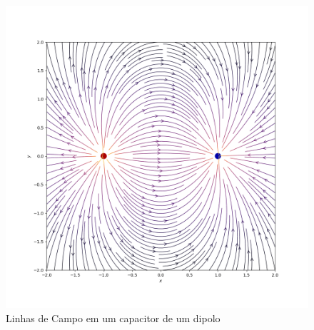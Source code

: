 \begin{figure}[h!]
\centering
\includegraphics[scale=0.6]{Images/dipolo.png}
\caption{Linhas de Campo em um capacitor de um dipolo}\label{fig:dipole-saida}
\end{figure}

